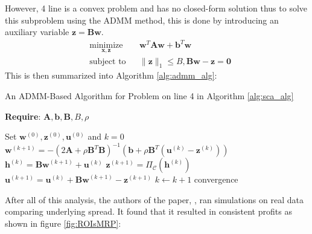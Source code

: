 \noindent However, 4 line is a convex problem and has no closed-form solution thus to solve this subproblem using the ADMM method, this is done by introducing an auxiliary variable $\mathbf{z = Bw}$.
\begin{equation*}
    \begin{aligned}
         & \underset{\mathbf{x, z}}{\text{minimize}}
         &                                           & \mathbf{w}^{T}\mathbf{A}\mathbf{w} + \mathbf{b}^{T}\mathbf{w} \\
         & \text{subject to}
         &                                           & \big\| \mathbf{z} \big\|_1 \leq B, \mathbf{Bw - z=0}
    \end{aligned}
\end{equation*}
\noindent This is then summarized into Algorithm \ref{alg:admm_alg}:
\begin{algorithm}
    \caption{An ADMM-Based Algorithm for Problem on line 4 in Algorithm \ref{alg:sca_alg}}\label{alg:admm_alg}
    \textbf{Require}: $\mathbf{A}, \mathbf{b}, \mathbf{B}, B, \rho$
    \begin{algorithmic}[1]
        \State Set $\mathbf{w}^{(0)}, \mathbf{z}^{(0)}, \mathbf{u}^{(0)}$ and $k=0$
        \Repeat
        \State $\mathbf{w}^{(k+1)} = -(2\mathbf{A} + \rho \mathbf{B}^T\mathbf{B})^{-1}(\mathbf{b} + \rho \mathbf{B}^T(\mathbf{u}^{(k)} - \mathbf{z}^{(k)}))$
        \State $\mathbf{h}^{(k)} = \mathbf{Bw}^{(k+1)} + \mathbf{u}^{(k)}$
        \State $\mathbf{z}^{(k+1)} = \Pi_{\mathcal{C}}(\mathbf{h}^{(k)})$
        \State $\mathbf{u}^{(k+1)} = \mathbf{u}^{(k)} + \mathbf{Bw}^{(k+1)} - \mathbf{z}^{(k+1)}$
        \State $k \leftarrow k+1$
        \Until convergence
    \end{algorithmic}
\end{algorithm}

\noindent After all of this analysis, the authors of the paper, \cite{8450775, ZipingZhao2019OMPW}, ran simulations on real data comparing underlying spread. It found that it resulted in consistent profits as shown in figure \ref{fig:ROIsMRP}:

